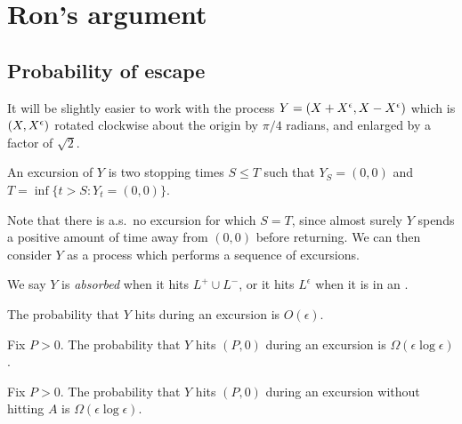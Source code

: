 {
\section{Ron's argument}

\newcommand{\bandwidth}{\delta}
\newcommand{\rotproc}{Y}

\newcommand{\union}{\cup}
\renewcommand{\L}{L^+ \union L^-}
\newcommand{\Le}{L^\epsilon}

\subsection{Probability of escape}

It will be slightly easier to work with the process $\rotproc =
(\sampled + \resamplede, \sampled - \resamplede)$ which is $(X,
X^{\epsilon})$ rotated clockwise about the origin by $\pi / 4$ radians, and enlarged by a factor of
$\sqrt{2}$.

\newcommand{\boundarylines}{A}
\newcommand{\farpoint}{(P,0)}

\begin{definition}
  An excursion of $Y$ is two stopping times $S \le T$ such that $Y_S =
  (0,0)$ and $T = \inf\{ t > S : Y_t = (0,0) \}$.
\end{definition}

Note that there is a.s.\ no excursion for which $S = T$, since almost
surely $Y$ spends a positive amount of time away from $(0,0)$ before
returning.  We can then consider $Y$ as a process which performs a
sequence of excursions.

\begin{definition}
  We say $Y$ is \emph{absorbed} when it hits $\L$, or it hits $\Le$
  when it is in an .
\end{definition}

\begin{lemma}
  \label{lem:Phitboundaryline}
  The probability that $Y$ hits \FIXME{$\boundarylines$}{define this} during an excursion
  is $O(\epsilon)$.
\end{lemma}

\newcommand{\Omegaeloge}{\Omega(\epsilon\log\epsilon)}

\begin{lemma}
  \label{lem:Pabsorbedandtravelsfar}
  Fix $P > 0$.  The probability that $Y$ hits $\farpoint$ during an
  excursion is $\Omegaeloge$.
\end{lemma}

\begin{lemma}
  Fix $P > 0$.  The probability that $Y$ hits $\farpoint$ during an
  excursion without hitting $A$ is $\Omegaeloge$.
\end{lemma}

}
